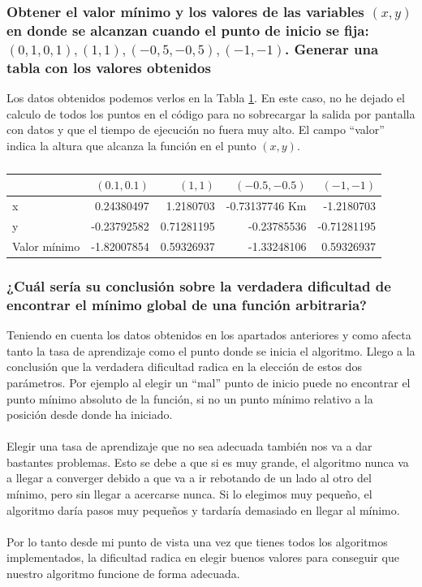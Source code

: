 \documentclass[12pt,a4paper]{article}
\begin{document}
\subsubsection{Obtener el valor mínimo y los valores de las variables \((x, y)\) en donde se alcanzan cuando el punto de inicio se fija: \((0,1, 0,1), (1, 1),(-0,5, -0,5),(-1, -1)\). Generar una tabla con los valores obtenidos}
Los datos obtenidos podemos verlos en la Tabla \ref{tab:title}. En este caso, no he dejado el calculo de todos los puntos en el código para no sobrecargar la salida por pantalla con datos y que el tiempo de ejecución no fuera muy alto. El campo ``valor'' indica la altura que alcanza la función en el punto \((x,y)\).
\begin{table}[H]

	\caption {} \label{tab:title} 
	   
	\begin{tabular}{|l|r|r|r|r|}
		\hline
		\backslashbox{Valor final}{Punto} &  \((0.1 , 0.1)\) & \((1 , 1)\) & \((-0.5 , -0.5)\) & \((-1 , -1)\)\\
		\hline
		x & 0.24380497 & 1.2180703  & -0.73137746 Km & -1.2180703\\
		\hline
		y & -0.23792582 & 0.71281195 & -0.23785536 & -0.71281195\\
		\hline
		Valor mínimo & -1.82007854 & 0.59326937 & -1.33248106 & 0.59326937\\
		\hline
	\end{tabular}
\end{table}
\subsubsection{¿Cuál sería su conclusión sobre la verdadera dificultad de encontrar el mínimo	global de una función arbitraria?}
Teniendo en cuenta los datos obtenidos en los apartados anteriores y como afecta tanto la tasa de aprendizaje como el punto donde se inicia el algoritmo. Llego a la conclusión que la verdadera dificultad radica en la elección de estos dos parámetros. Por ejemplo al elegir un ``mal'' punto de inicio puede no encontrar el punto mínimo absoluto de la función, si no un punto mínimo relativo a la posición desde donde ha iniciado. \\\\
Elegir una tasa de aprendizaje que no sea adecuada también nos va a dar bastantes problemas. Esto se debe a que si es muy grande, el algoritmo nunca va a llegar a converger debido a que va a ir rebotando de un lado al otro del mínimo, pero sin llegar a acercarse nunca. Si lo elegimos muy pequeño, el algoritmo daría pasos muy pequeños y tardaría demasiado en llegar al mínimo.\\\\
Por lo tanto desde mi punto de vista una vez que tienes todos los algoritmos implementados, la dificultad radica en elegir buenos valores para conseguir que nuestro algoritmo funcione de forma adecuada.\textbf{}
\end{document}
